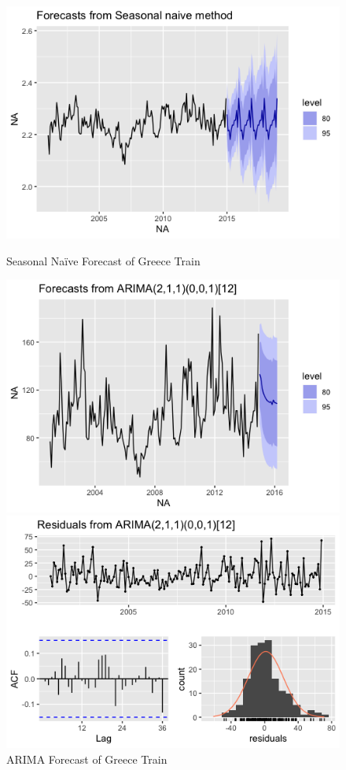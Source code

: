 \documentclass[12pt]{article}
\begin{document}
\begin{figure}[!tbp]
  \begin{minipage}[b]{0.32\textwidth}
    \includegraphics[width=\textwidth]{Pre_sn.png}
    \caption{Seasonal Naïve Forecast of Greece Train}
  \end{minipage}
  \hfill
  \begin{minipage}[b]{0.32\textwidth}
    \includegraphics[width=\textwidth]{Pre_rm.png}
    \caption{ARIMA Forecast of Greece Train}
  \end{minipage}
  \begin{minipage}[b]{0.34\textwidth}
    \includegraphics[width=\textwidth]{Residuals.png}

\end{minipage}
\end{figure}
\end{document}
